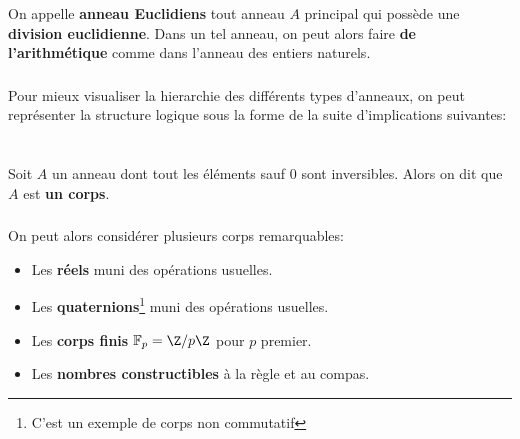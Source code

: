 \subsection*{}
\subsection*{}
\subsection*{}
\subsection*{}
On appelle \textbf{anneau Euclidiens} tout anneau \(A\) principal qui possède une \textbf{division euclidienne}. Dans un tel anneau, on peut alors faire \textbf{de l'arithmétique} comme dans l'anneau des entiers naturels.
\subsection*{}
Pour mieux visualiser la hierarchie des différents types d'anneaux, on peut représenter la structure logique sous la forme de la suite d'implications suivantes:
\begin{center}
\end{center}
\chapter*{}
Soit \(A\) un anneau dont tout les éléments sauf \(0\) sont inversibles. Alors on dit que \(A\) est \textbf{un corps}.

\subsection*{}
On peut alors considérer plusieurs corps remarquables:
\begin{itemize}
   \item Les \textbf{réels} muni des opérations usuelles.
   \item Les \textbf{quaternions}\footnote[1]{C'est un exemple de corps non commutatif} muni des opérations usuelles.
   \item Les \textbf{corps finis} \(\mathbb{F}_p = \Z/p\Z\) pour \(p\) premier.
   \item Les \textbf{nombres constructibles} à la règle et au compas.
\end{itemize}

